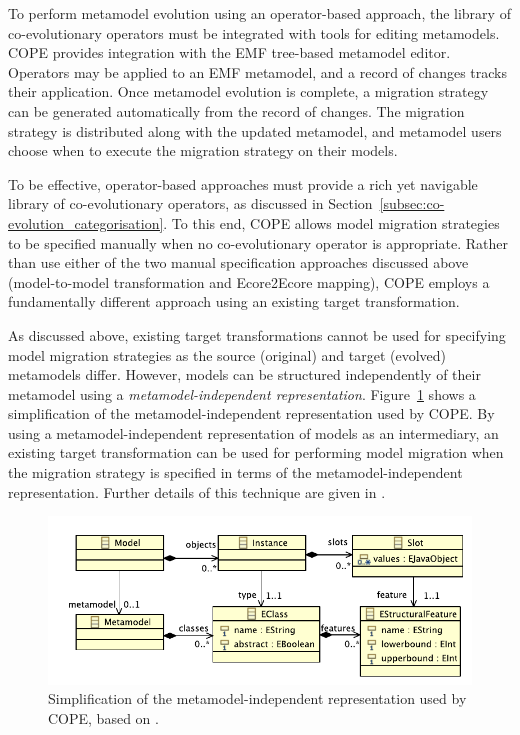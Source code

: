 To perform metamodel evolution using an operator-based approach, the library of co-evolutionary operators must be integrated with tools for editing metamodels. COPE provides integration with the EMF tree-based metamodel editor. Operators may be applied to an EMF metamodel, and a record of changes tracks their application. Once metamodel evolution is complete, a migration strategy can be generated automatically from the record of changes. The migration strategy is distributed along with the updated metamodel, and metamodel users choose when to execute the migration strategy on their models.

To be effective, operator-based approaches must provide a rich yet navigable library of co-evolutionary operators, as discussed in Section~\ref{subsec:co-evolution_categorisation}. To this end, COPE allows model migration strategies to be specified manually when no co-evolutionary operator is appropriate. Rather than use either of the two manual specification approaches discussed above (model-to-model transformation and Ecore2Ecore mapping), COPE employs a fundamentally different approach using an existing target transformation.

As discussed above, existing target transformations cannot be used for specifying model migration strategies as the source (original) and target (evolved) metamodels differ. However, models can be structured independently of their metamodel using a \emph{metamodel-independent representation}. Figure~\ref{fig:cope_mmi} shows a simplification of the metamodel-independent representation used by COPE. By using a metamodel-independent representation of models as an intermediary, an existing target transformation can be used for performing model migration when the migration strategy is specified in terms of the metamodel-independent representation. Further details of this technique are given in \cite{herrmannsdoerfer09cope}.

\begin{figure}[tbp]
  \centering
  \includegraphics[scale=0.75]{5.Implementation/cope_mm.pdf}
  \caption[The metamodel-independent representation used by COPE]{Simplification of the metamodel-independent representation used by COPE, based on \cite{herrmannsdoerfer09cope}.}
  \label{fig:cope_mmi}
\end{figure}

